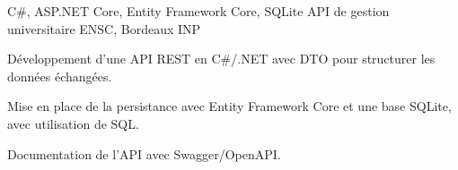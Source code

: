 
\begin{cventries}
  \cventry
    {C\#, ASP.NET Core, Entity Framework Core, SQLite}
    {API de gestion universitaire}
    {ENSC, Bordeaux INP}
    {}
    {
      \begin{cvitems}
        \item {Développement d’une API REST en C\#/.NET avec DTO pour structurer les données échangées.}
        \item {Mise en place de la persistance avec Entity Framework Core et une base SQLite, avec utilisation de SQL.}
        \item {Documentation de l’API avec Swagger/OpenAPI.}
      \end{cvitems}
    }
\end{cventries}
